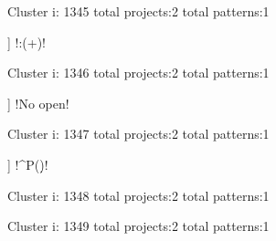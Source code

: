 Cluster i: 1345
total projects:2
total patterns:1
\begin{multicols}{1}
\begin{description}[noitemsep,topsep=0pt]
\item [[2] ] \cverb!:(\s+)!
\end{description}
\end{multicols}







Cluster i: 1346
total projects:2
total patterns:1
\begin{multicols}{1}
\begin{description}[noitemsep,topsep=0pt]
\item [[2] ] \cverb!No open!
\end{description}
\end{multicols}







Cluster i: 1347
total projects:2
total patterns:1
\begin{multicols}{1}
\begin{description}[noitemsep,topsep=0pt]
\item [[2] ] \cverb!^P(\d)!
\end{description}
\end{multicols}







Cluster i: 1348
total projects:2
total patterns:1
\begin{multicols}{1}
\end{multicols}







Cluster i: 1349
total projects:2
total patterns:1
\begin{multicols}{1}
\end{multicols}







